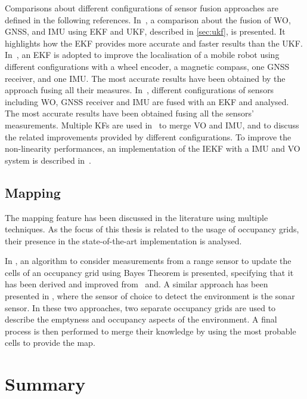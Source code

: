 Comparisons about different configurations of sensor fusion approaches are defined in the following references.
In~\cite{amador_robot_2019}, a comparison about the fusion of \gls{WO}, \gls{GNSS}, and \gls{IMU} using \gls{EKF} and \gls{UKF}, described in \ref{sec:ukf}, is presented. It highlights how the \gls{EKF} provides more accurate and faster results than the \gls{UKF}.
In~\cite{7373480}, an \gls{EKF} is adopted to improve the localisation of a mobile robot using different configurations with a wheel encoder, a magnetic compass, one \gls{GNSS} receiver, and one \gls{IMU}. The most accurate results have been obtained by the approach fusing all their measures.
In~\cite{8696103}, different configurations of sensors including \gls{WO}, \gls{GNSS} receiver and \gls{IMU} are fused with an \gls{EKF} and analysed. The most accurate results have been obtained fusing all the sensors' measurements.
Multiple \glspl{KF} are used in~\cite{liu2016stereo} to merge \gls{VO} and \gls{IMU}, and to discuss the related improvements provided by different configurations.
To improve the non-linearity performances, an implementation of the \gls{IEKF} with a \gls{IMU} and \gls{VO} system is described in~\cite{bloesch2017iterated}.


\subsection{Mapping}
\noindent The mapping feature has been discussed in the literature using multiple techniques.
As the focus of this thesis is related to the usage of occupancy grids, their presence in the state-of-the-art implementation is analysed.

In \cite{joubert2012adaptive}, an algorithm to consider measurements from a range sensor to update the cells of an occupancy grid using Bayes Theorem is presented, specifying that it has been derived and improved from~\cite{12145} and\cite{thrun_probabilistic_2005}.
A similar approach has been presented in \cite{singh_sonar_2019}, where the sensor of choice to detect the environment is the sonar sensor.
In these two approaches, two separate occupancy grids are used to describe the emptyness and occupancy aspects of the environment. A final process is then performed to merge their knowledge by using the most probable cells to provide the map.



\section{Summary}

